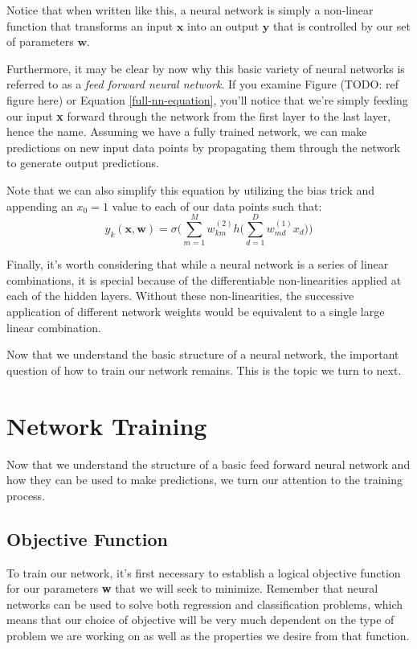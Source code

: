 Notice that when written like this, a neural network is simply a non-linear function that transforms an input $\textbf{x}$ into an output $\textbf{y}$ that is controlled by our set of parameters $\textbf{w}$.

Furthermore, it may be clear by now why this basic variety of neural networks is referred to as a \textit{feed forward neural network}. If you examine Figure (TODO: ref figure here) or Equation \ref{full-nn-equation}, you'll notice that we're simply feeding our input \textbf{x} forward through the network from the first layer to the last layer, hence the name. Assuming we have a fully trained network, we can make predictions on new input data points by propagating them through the network to generate output predictions.

Note that we can also simplify this equation by utilizing the bias trick and appending an $x_{0}=1$ value to each of our data points such that:
\begin{equation*}
	y_{k}(\textbf{x}, \textbf{w}) = \sigma\bigg(\sum_{m=1}^{M}w_{km}^{(2)} h\bigg(\sum_{d=1}^{D}w_{md}^{(1)}x_{d}\bigg)\bigg)
\end{equation*}

Finally, it's worth considering that while a neural network is a series of linear combinations, it is special because of the differentiable non-linearities applied at each of the hidden layers. Without these non-linearities, the successive application of different network weights would be equivalent to a single large linear combination.

Now that we understand the basic structure of a neural network, the important question of how to train our network remains. This is the topic we turn to next.

\section{Network Training}
Now that we understand the structure of a basic feed forward neural network and how they can be used to make predictions, we turn our attention to the training process.

\subsection{Objective Function}
To train our network, it's first necessary to establish a logical objective function for our parameters \textbf{w} that we will seek to minimize. Remember that neural networks can be used to solve both regression and classification problems, which means that our choice of objective will be very much dependent on the type of problem we are working on as well as the properties we desire from that function.

